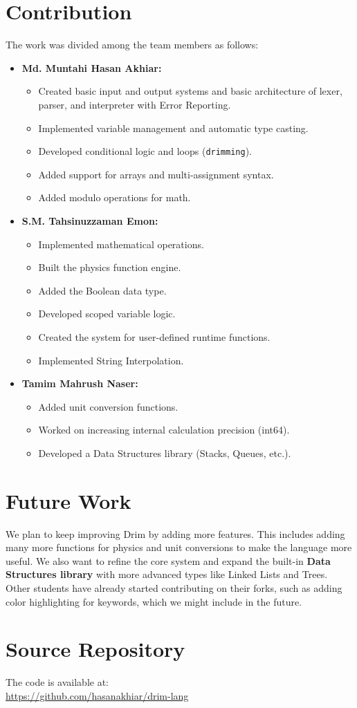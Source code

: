 \documentclass[12pt, a4paper]{article}
\begin{document}
\section{Contribution}
The work was divided among the team members as follows:
\begin{itemize}
    \item \textbf{Md. Muntahi Hasan Akhiar:}
    \begin{itemize}
        \item Created basic input and output systems and basic architecture of lexer, parser, and interpreter with Error Reporting.
        \item Implemented variable management and automatic type casting.
        \item Developed conditional logic and loops (\texttt{drimming}).
        \item Added support for arrays and multi-assignment syntax.
        \item Added modulo operations for math.
    \end{itemize}
    \item \textbf{S.M. Tahsinuzzaman Emon:}
    \begin{itemize}
        \item Implemented mathematical operations.
        \item Built the physics function engine.
        \item Added the Boolean data type.
        \item Developed scoped variable logic.
        \item Created the system for user-defined runtime functions.
        \item Implemented String Interpolation.
    \end{itemize}
    \item \textbf{Tamim Mahrush Naser:}
    \begin{itemize}
        \item Added unit conversion functions.
        \item Worked on increasing internal calculation precision (int64).
        \item Developed a Data Structures library (Stacks, Queues, etc.).
    \end{itemize}
\end{itemize}

\vspace{1cm}

\section{Future Work}
We plan to keep improving Drim by adding more features. This includes adding many more functions for physics and unit conversions to make the language more useful. We also want to refine the core system and expand the built-in \textbf{Data Structures library} with more advanced types like Linked Lists and Trees. Other students have already started contributing on their forks, such as adding color highlighting for keywords, which we might include in the future.

\vspace{1cm}

\section{Source Repository}
The code is available at: \\
\url{https://github.com/hasanakhiar/drim-lang}
\end{document}
